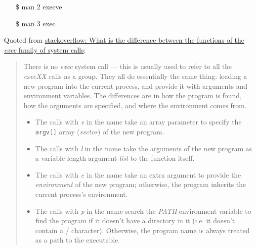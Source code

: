 \begin{frame}
  \begin{block}{}
    \begin{center}
    \end{center}
  \end{block}\ttfamily
  \begin{itemize}
  \item[\$] man 2 execve
  \item[\$] man 3 exec
  \end{itemize}
\end{frame}

Quoted from
\href{https://stackoverflow.com/questions/20823371/what-is-the-difference-between-the-functions-of-the-exec-family-of-system-calls}{
  stackoverflow: What is the difference between the functions of the \emph{exec} family of system calls}:

\begin{quote}
  There is no \emph{exec} system call --- this is usually used to refer to all the
  \emph{execXX} calls as a group. They all do essentially the same thing: loading a new
  program into the current process, and provide it with arguments and environment
  variables. The differences are in how the program is found, how the arguments are
  specified, and where the environment comes from.

  \begin{itemize}
  \item The calls with \emph{v} in the name take an array parameter to specify the
    \texttt{argv[]} array (\emph{vector}) of the new program.
  \item The calls with \emph{l} in the name take the arguments of the new program as a
    variable-length argument \emph{list} to the function itself.
  \item The calls with \emph{e} in the name take an extra argument to provide the
    \emph{environment} of the new program; otherwise, the program inherits the current
    process's environment.
  \item The calls with \emph{p} in the name search the \emph{PATH} environment variable to
    find the program if it doesn't have a directory in it (i.e. it doesn't contain a /
    character). Otherwise, the program name is always treated as a path to the executable.
  \end{itemize}
\end{quote}

